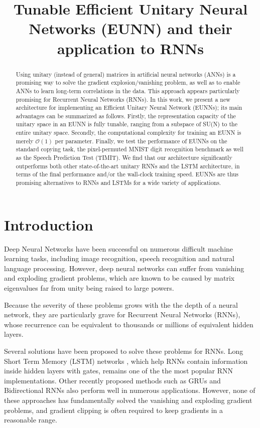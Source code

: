 \title{Tunable Efficient Unitary Neural Networks (EUNN) and their application to RNNs}

\begin{abstract}
Using unitary (instead of general) matrices in artificial neural networks (ANNs) is a promising way to solve the gradient explosion/vanishing problem, as well as to enable ANNs to learn long-term correlations in the data. This approach appears particularly promising for Recurrent Neural Networks (RNNs). In this work, we present a new architecture for implementing an Efficient Unitary Neural Network (EUNNs); its main advantages can be summarized as follows. Firstly, the representation capacity of the unitary space in an EUNN is fully tunable, ranging from a subspace of SU(N) to the entire unitary space. Secondly, the computational complexity for training an EUNN is merely $\mathcal{O}(1)$ per parameter. Finally, we test the performance of EUNNs on the standard copying task, the pixel-permuted MNIST digit recognition benchmark as well as the Speech Prediction Test (TIMIT). We find that our architecture significantly outperforms both other state-of-the-art unitary RNNs and the LSTM architecture, in terms of the final performance and/or the wall-clock training speed. EUNNs are thus promising alternatives to RNNs and LSTMs for a wide variety of applications.
\end{abstract}

\section{Introduction}
Deep Neural Networks \cite{lecun2015deep} have been successful on numerous difficult machine learning tasks, including image recognition\cite{krizhevsky2012imagenet,donahue2015long}, speech recognition\cite{hinton2012deep} and natural language processing\cite{collobert2011natural,bahdanau2014neural,sutskever2014sequence}. However, deep neural networks can suffer from vanishing and exploding gradient problems\cite{hochreiter1991untersuchungen,bengio1994learning}, which are known to be caused by matrix eigenvalues far from unity being raised to large powers.

Because the severity of these problems grows with the the depth of a neural network, they are particularly grave for Recurrent Neural Networks (RNNs), whose recurrence can be equivalent to thousands or millions of equivalent hidden layers.

Several solutions have been proposed to solve these problems for RNNs. Long Short Term Memory (LSTM) networks \cite{hochreiter1997long}, which help RNNs contain information inside hidden layers with gates, remains one of the the most popular RNN implementations. Other recently proposed methods such as GRUs\cite{cho2014properties} and Bidirectional RNNs \cite{berglund2015bidirectional} also perform well in numerous applications. However, none of these approaches has fundamentally solved the vanishing and exploding gradient problems, and gradient clipping is often required to keep gradients in a reasonable range.

